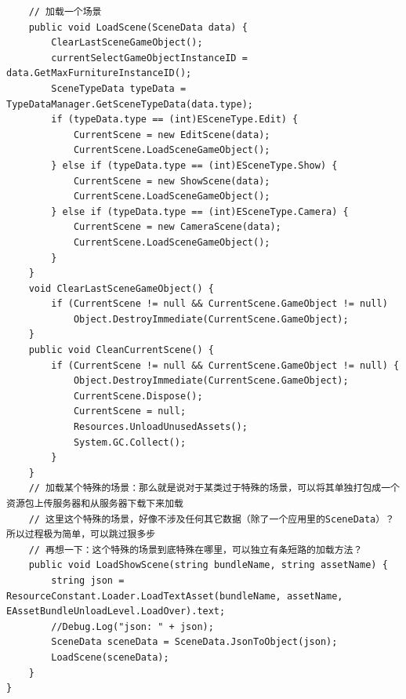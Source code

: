 \documentclass[9pt, b5paper]{article}
\begin{document}
\begin{verbatim}
    // 加载一个场景
    public void LoadScene(SceneData data) {
        ClearLastSceneGameObject();
        currentSelectGameObjectInstanceID = data.GetMaxFurnitureInstanceID();
        SceneTypeData typeData = TypeDataManager.GetSceneTypeData(data.type);
        if (typeData.type == (int)ESceneType.Edit) {
            CurrentScene = new EditScene(data);
            CurrentScene.LoadSceneGameObject();
        } else if (typeData.type == (int)ESceneType.Show) {
            CurrentScene = new ShowScene(data);
            CurrentScene.LoadSceneGameObject();
        } else if (typeData.type == (int)ESceneType.Camera) {
            CurrentScene = new CameraScene(data);
            CurrentScene.LoadSceneGameObject();
        }
    }
    void ClearLastSceneGameObject() {
        if (CurrentScene != null && CurrentScene.GameObject != null) 
            Object.DestroyImmediate(CurrentScene.GameObject);
    }
    public void CleanCurrentScene() {
        if (CurrentScene != null && CurrentScene.GameObject != null) {
            Object.DestroyImmediate(CurrentScene.GameObject);
            CurrentScene.Dispose();
            CurrentScene = null;
            Resources.UnloadUnusedAssets();
            System.GC.Collect();
        }
    }
    // 加载某个特殊的场景：那么就是说对于某类过于特殊的场景，可以将其单独打包成一个资源包上传服务器和从服务器下载下来加载
    // 这里这个特殊的场景，好像不涉及任何其它数据（除了一个应用里的SceneData）？所以过程极为简单，可以跳过狠多步
    // 再想一下：这个特殊的场景到底特殊在哪里，可以独立有条短路的加载方法？
    public void LoadShowScene(string bundleName, string assetName) {
        string json = ResourceConstant.Loader.LoadTextAsset(bundleName, assetName, EAssetBundleUnloadLevel.LoadOver).text;
        //Debug.Log("json: " + json);
        SceneData sceneData = SceneData.JsonToObject(json);
        LoadScene(sceneData);
    }
}
\end{verbatim}
\end{document}
